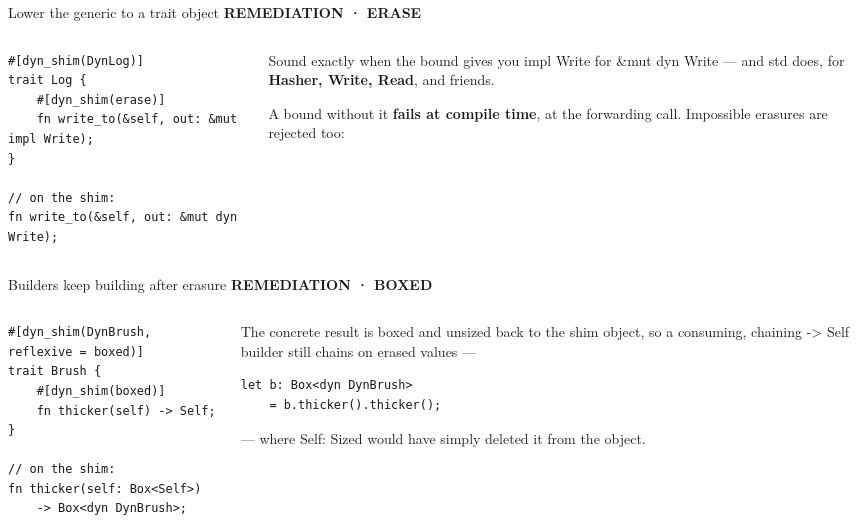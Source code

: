 \documentclass[aspectratio=169,11pt,t]{beamer}
\newcommand{\code}[1]{{\ttfamily\small\color{oxidesoft}#1}}
\newcommand{\eyebrow}[2][steel]{{\ttfamily\scriptsize\bfseries\color{#1}\MakeUppercase{#2}}\par\vspace{0.4em}}
\newcommand{\ledesm}[1]{{\color{muted}\fontsize{11.3}{16}\selectfont #1\par}}
\newcommand{\tx}[1]{{\color{text}\bfseries#1}}
\begin{document}
\begin{frame}[fragile]{Lower the generic to a trait object}
\eyebrow[oxide]{Remediation · erase}
\begin{columns}[T]
\begin{column}{0.5\textwidth}
\begin{lstlisting}
#[dyn_shim(DynLog)]
trait Log {
    #[dyn_shim(erase)]
    fn write_to(&self, out: &mut impl Write);
}

// on the shim:
fn write_to(&self, out: &mut dyn Write);
\end{lstlisting}
\end{column}
\begin{column}{0.5\textwidth}
\ledesm{Sound exactly when the bound gives you \code{impl Write for \&mut dyn Write} --- and std does, for \tx{Hasher, Write, Read}, and friends.}
\vspace{0.7em}
\ledesm{A bound without it \tx{fails at compile time}, at the forwarding call. Impossible erasures are rejected too:}
\vspace{0.4em}
\end{column}
\end{columns}
\end{frame}

\begin{frame}[fragile]{Builders keep building after erasure}
\eyebrow[oxide]{Remediation · boxed}
\begin{columns}[T]
\begin{column}{0.5\textwidth}
\begin{lstlisting}
#[dyn_shim(DynBrush, reflexive = boxed)]
trait Brush {
    #[dyn_shim(boxed)]
    fn thicker(self) -> Self;
}

// on the shim:
fn thicker(self: Box<Self>)
    -> Box<dyn DynBrush>;
\end{lstlisting}
\end{column}
\begin{column}{0.5\textwidth}
\ledesm{The concrete result is boxed and unsized back to the shim object, so a consuming, chaining \code{-> Self} builder still chains on erased values ---}
\vspace{0.5em}
\begin{lstlisting}
let b: Box<dyn DynBrush>
    = b.thicker().thicker();
\end{lstlisting}
\vspace{0.5em}
\ledesm{--- where \code{Self: Sized} would have simply deleted it from the object.}
\end{column}
\end{columns}
\end{frame}
\end{document}
